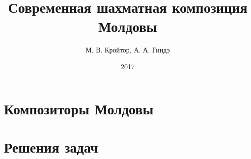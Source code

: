 \documentclass[12pt,a5paper]{book}
\title{Современная шахматная композиция Молдовы}
\author{М. В. Кройтор, А. А. Гиндэ}
\date{2017}
\begin{document}
\maketitle
\tableofcontents

\chapter{Композиторы Молдовы}






\chapter{Решения задач}



\end{document}
